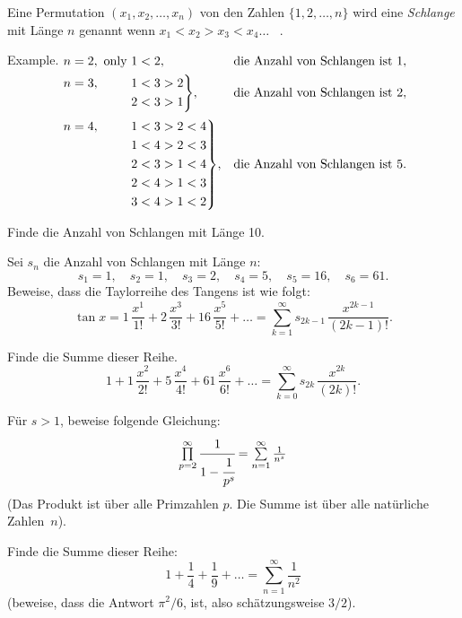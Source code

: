 \documentclass[12pt]{article} %
\begin{document}
\newpage
{} Eine Permutation $(x_1,x_2, \dots,x_n)$ von den Zahlen $\{1, 2, \dots, n\}$ wird eine
\emph{Schlange} mit Länge $n$ genannt wenn $x_1<x_2>x_3<x_4 \dots$ \ .
\medskip

{\sc Example.}
$\begin{aligned}[t]
&\begin{aligned}[t] n=2, \text{ only } 1<2, \end{aligned} &&\text{die Anzahl von Schlangen ist }1, \\
&\hskip-\nulldelimiterspace\mathord{\left.\begin{aligned} n=3, \hphantom{\text{ only }} 1&<3>2 \\ 
2&<3>1\end{aligned} \right\}}, && \text{die Anzahl von Schlangen ist }2, \\[2pt]
&\hskip-\nulldelimiterspace\mathord{\left.\begin{aligned} n=4, \hphantom{\text{ only }} 1&<3>2<4 \\ 
1&<4>2<3 \\ 
2&<3>1<4 \\ 
2&<4>1<3 \\ 
3&<4>1<2\end{aligned} \right\}},
&&\text{die Anzahl von Schlangen ist }5. \\
\end{aligned}$

\medskip
\noindent 
Finde die Anzahl von Schlangen mit Länge 10. 

\bigskip
{} Sei $s_n$ die Anzahl von Schlangen mit Länge $n$:
$$
s_1=1, \quad s_2=1, \quad s_3=2, \quad s_4=5, \quad s_5=16, \quad s_6=61.
$$
Beweise, dass die Taylorreihe des Tangens ist wie folgt: 
$$
\tan x=1\, \frac{x^1}{1!}+2\, \frac{x^3}{3!}+16\, \frac{x^5}{5!}+\dots=
\textstyle\sum\limits_{k=1}^{\infty} s_{2k-1}\, \frac{x^{2k-1}}{(2k-1)!}.
$$

\bigskip
{} Finde die Summe dieser Reihe.
$$
1+1\, \frac{x^2}{2!}+5\, \frac{x^4}{4!}+61\, \frac{x^6}{6!}+\dots=
\textstyle\sum\limits_{k=0}^{\infty} s_{2k}\,\frac{x^{2k}}{(2k)!}.
$$

\bigskip
{} Für $s>1$, beweise folgende Gleichung:
$$
\textstyle\prod\limits_{p=2}^{\infty} \cfrac{1}{1-\cfrac{1}{p^s}}=\sum\limits_{n=1}^{\infty} \frac{1}{n^s}
$$ 
(Das Produkt ist über alle Primzahlen $p$. Die Summe ist über alle natürliche Zahlen~$n$).

\newpage
{} Finde die Summe dieser Reihe:
$$
1+ \frac{1}{4}+ \frac{1}{9}+\dots=\textstyle\sum\limits_{n=1}^{\infty} \frac{1}{n^2}
$$
(beweise, dass die Antwort $\pi^2/6$, ist, also schätzungsweise $3/2$). 
\end{document}
